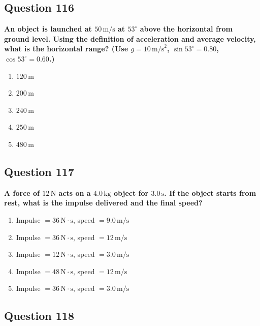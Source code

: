 \documentclass[12pt,letterpaper]{article}
\begin{document}
\subsection{Question 116}

\begin{questionbox}
\textbf{An object is launched at $50\,\text{m/s}$ at $53^\circ$ above the horizontal from ground level. Using the definition of acceleration and average velocity, what is the horizontal range? (Use $g = 10\,\text{m/s}^2$, $\sin 53^\circ = 0.80$, $\cos 53^\circ = 0.60$.)}

\begin{enumerate}[label=\alph*)]
    \item $120\,\text{m}$
    \item $200\,\text{m}$
    \item $240\,\text{m}$
    \item $250\,\text{m}$
    \item $480\,\text{m}$
\end{enumerate}
\end{questionbox}

\subsection{Question 117}

\begin{questionbox}
\textbf{A force of $12\,\text{N}$ acts on a $4.0\,\text{kg}$ object for $3.0\,\text{s}$. If the object starts from rest, what is the impulse delivered and the final speed?}

\begin{enumerate}[label=\alph*)]
    \item Impulse $= 36\,\text{N}\cdot\text{s}$, speed $= 9.0\,\text{m/s}$
    \item Impulse $= 36\,\text{N}\cdot\text{s}$, speed $= 12\,\text{m/s}$
    \item Impulse $= 12\,\text{N}\cdot\text{s}$, speed $= 3.0\,\text{m/s}$
    \item Impulse $= 48\,\text{N}\cdot\text{s}$, speed $= 12\,\text{m/s}$
    \item Impulse $= 36\,\text{N}\cdot\text{s}$, speed $= 3.0\,\text{m/s}$
\end{enumerate}
\end{questionbox}

\subsection{Question 118}
\end{document}
